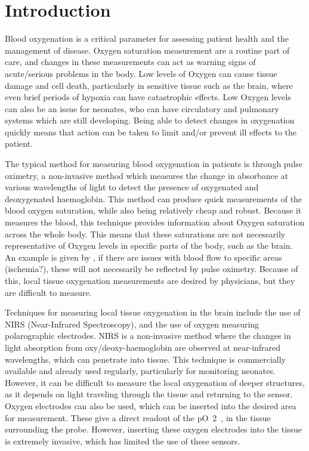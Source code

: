 \chapter{Introduction}\label{ch:intro}

Blood oxygenation is a critical parameter for assessing patient health and the management of disease.
Oxygen saturation measurement are a routine part of care, and changes in these measurements can act as warning signs of acute/serious problems in the body.
Low levels of Oxygen can cause tissue damage and cell death, particularly in sensitive tissue such as the brain, where even brief periods of
hypoxia can have catastrophic effects.
Low Oxygen levels can also be an issue for neonates, who can have circulatory and pulmonary systems which are still developing.
Being able to detect changes in oxygenation quickly means that action can be taken to limit and/or prevent ill effects to the patient.

The typical method for measuring blood oxygenation in patients is through pulse oximetry, a non-invasive method which measures the change in absorbance at
various wavelengths of light to detect the presence of oxygenated and deoxygenated haemoglobin.
This method can produce quick measurements of the blood oxygen saturation, while also being relatively cheap and robust.
Because it measures the blood, this technique provides information about Oxygen saturation across the whole body.
This means that these saturations are not necessarily representative of Oxygen levels in specific parts of the body, such as the brain.
An example is given by , if there are issues with blood flow to specific areas (ischemia?), these will not necessarily be reflected by pulse oximetry.
Because of this, local tissue oxygenation measurements are desired by physicians, but they are difficult to measure.

Techniques for measuring local tissue oxygenation in the brain include the use of NIRS (Near-Infrared Spectroscopy), and the use of oxygen measuring
polarographic electrodes.
NIRS is a non-invasive method where the changes in light absorption from oxy/deoxy-haemoglobin are observed at near-infrared wavelengths, which can penetrate
into tissue.
This technique is commercially available and already used regularly, particularly for monitoring neonates.
However, it can be difficult to measure the local oxygenation of deeper structures, as it depends on light traveling through the tissue and returning to the sensor.
Oxygen electrodes can also be used, which can be inserted into the desired area for measurement.
These give a direct readout of the pO~2~, in the tissue surrounding the probe.
However, inserting these oxygen electrodes into the tissue is extremely invasive, which has limited the use of these sensors.

